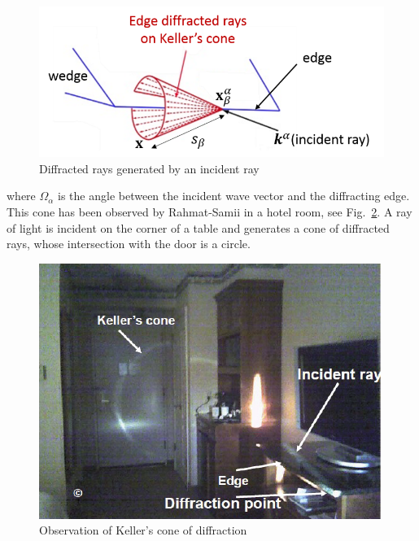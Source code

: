 \begin{figure}
    \centering
    \includegraphics[width=\textwidth]{images/chapter1/KellerCone.png}
    \caption{Diffracted rays generated by an incident ray}
    \label{KellerCone}
\end{figure}
where $\Omega_{\alpha}$ is the angle between the incident wave vector and the diffracting edge. This cone has been observed by Rahmat-Samii \cite{ConePhoto} in a hotel room, see Fig.~\ref{PhotoCone}. A ray of light is incident on the corner of a table and generates a cone of diffracted rays, whose intersection with the door is a circle.

\begin{figure}
    \centering
    \includegraphics{images/chapter1/HotelCone.png}
    \caption{Observation of Keller's cone of diffraction}
    \label{PhotoCone}
\end{figure}

